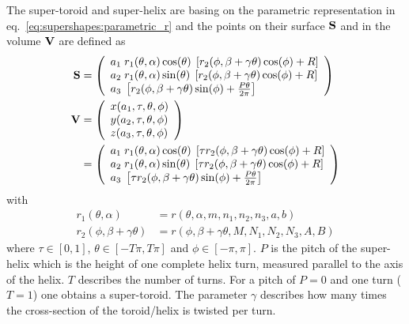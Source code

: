 The super-toroid and super-helix are basing on the parametric representation in eq.\ \ref{eq:supershapes:parametric_r} and the points on their surface $ {\bf S}$ and in the volume $ {\bf V}$ are defined as
\begin{align}\label{eq:super_toroid_helix}
  {\bf S} &=
  \left(
    \begin{array}{l}
     a_1 \; r_1(\theta,\alpha) \cos(\theta) \; \left[r_2(\phi,\beta+\gamma\theta)\cos(\phi) +R\right]  \\
     a_2 \; r_1(\theta,\alpha) \sin(\theta) \; \left[r_2(\phi,\beta+\gamma\theta)\cos(\phi) +R\right]  \\
     a_3 \; \left[r_2(\phi,\beta+\gamma\theta)   \sin(\phi)+\frac{P\theta}{2\pi} \right]\\
    \end{array}
  \right) \\
{\bf V} &  = \left(
    \begin{array}{l}
      x(a_1,\tau,\theta,\phi) \\
      y(a_2,\tau,\theta,\phi) \\
      z(a_3,\tau,\theta,\phi) \\
    \end{array}
    \right) \nonumber \\
    &=
  \left(
    \begin{array}{l}
     a_1 \; r_1(\theta,\alpha) \cos(\theta) \; \left[\tau r_2(\phi,\beta+\gamma\theta)\cos(\phi) +R\right]  \\
     a_2 \; r_1(\theta,\alpha) \sin(\theta) \; \left[\tau r_2(\phi,\beta+\gamma\theta)\cos(\phi) +R\right]  \\
     a_3 \; \left[\tau r_2(\phi,\beta+\gamma\theta)   \sin(\phi)+\frac{P\theta}{2\pi} \right]\\
    \end{array}
  \right)
\end{align}
with
\begin{align} \label{eq:supershapes:parametric_r1}
r_1(\theta,\alpha) &= r(\theta,\alpha,m,n_1,n_2,n_3,a,b) \\
\label{eq:supershapes:parametric_r2}
r_2(\phi,\beta+\gamma\theta)   &= r(\phi,  \beta+\gamma\theta, M,N_1,N_2,N_3,A,B)
\end{align}
where $\tau\in[0,1]$, $\theta\in[-T\pi,T\pi]$ and $\phi\in\left[-\pi,\pi\right]$. $P$ is the pitch of the super-helix which is the height of one complete helix turn, measured parallel to the axis of the helix. $T$ describes the number of turns. For a pitch of $P=0$ and one turn ($T=1$) one obtains a super-toroid. The parameter $\gamma$ describes how many times the cross-section of the toroid/helix is twisted per turn.
